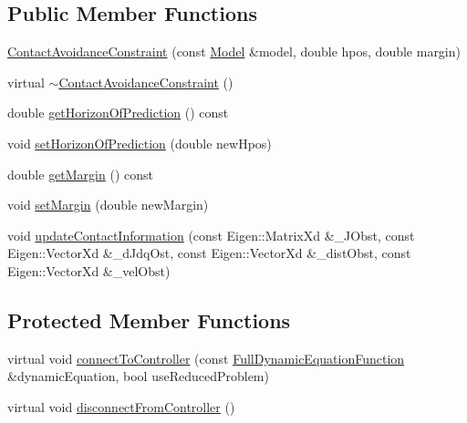 \subsection*{Public Member Functions}
\begin{DoxyCompactItemize}
\item 
\hyperlink{classocra_1_1ContactAvoidanceConstraint_a77ef6f814bddd8ff8eabb9cf1272b4a3}{Contact\+Avoidance\+Constraint} (const \hyperlink{classocra_1_1Model}{Model} \&model, double hpos, double margin)
\item 
virtual \hyperlink{classocra_1_1ContactAvoidanceConstraint_a57650df61143b936321c20d582f2457f}{$\sim$\+Contact\+Avoidance\+Constraint} ()
\item 
double \hyperlink{classocra_1_1ContactAvoidanceConstraint_af28ba9ca1181ffafaa14a014fa3b2b0e}{get\+Horizon\+Of\+Prediction} () const 
\item 
void \hyperlink{classocra_1_1ContactAvoidanceConstraint_a667de1446a83d166c7979b6066dd0720}{set\+Horizon\+Of\+Prediction} (double new\+Hpos)
\item 
double \hyperlink{classocra_1_1ContactAvoidanceConstraint_a6371b8f6860c81e47ec812a094a90d68}{get\+Margin} () const 
\item 
void \hyperlink{classocra_1_1ContactAvoidanceConstraint_a3504dbfab2c8e829bb73960891f4dd01}{set\+Margin} (double new\+Margin)
\item 
void \hyperlink{classocra_1_1ContactAvoidanceConstraint_a3d44cd52a5de9bc2d69da19b29a5d7f7}{update\+Contact\+Information} (const Eigen\+::\+Matrix\+Xd \&\+\_\+\+J\+Obst, const Eigen\+::\+Vector\+Xd \&\+\_\+d\+Jdq\+Ost, const Eigen\+::\+Vector\+Xd \&\+\_\+dist\+Obst, const Eigen\+::\+Vector\+Xd \&\+\_\+vel\+Obst)
\end{DoxyCompactItemize}
\subsection*{Protected Member Functions}
\begin{DoxyCompactItemize}
\item 
virtual void \hyperlink{classocra_1_1ContactAvoidanceConstraint_a9beada2720203ab46265f271309a2ab5}{connect\+To\+Controller} (const \hyperlink{classocra_1_1FullDynamicEquationFunction}{Full\+Dynamic\+Equation\+Function} \&dynamic\+Equation, bool use\+Reduced\+Problem)
\item 
virtual void \hyperlink{classocra_1_1ContactAvoidanceConstraint_a884358568ff7f5510d26ff96915a4d8c}{disconnect\+From\+Controller} ()
\end{DoxyCompactItemize}
